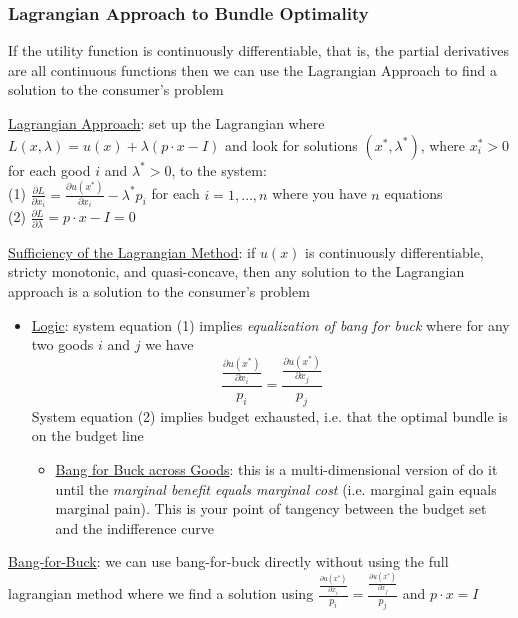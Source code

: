 \documentclass{article}
\begin{document}
\subsubsection{Lagrangian Approach to Bundle Optimality}
If the utility function is continuously differentiable, that is, the partial derivatives are all continuous functions then we can use the Lagrangian Approach to find a solution to the consumer's problem \par \vspace{0.3em}
  \underline{Lagrangian Approach}: set up the Lagrangian where $L(x, \lambda) = u(x) + \lambda (p \cdot x - I)$ and look for solutions $(x^{*}, \lambda^{*})$, where $x_{i}^{*} > 0$ for each good $i$ and $\lambda^{*} > 0$, to the system: \\
  \null\quad (1) $\tfrac{\partial L}{\partial x_{i}} = \tfrac{\partial u(x^{*})}{\partial x_{i}} - \lambda^{*}p_{i}$ \quad for each $i = 1, \dots, n$ where you have $n$ equations \\
  \null\quad (2) $\tfrac{\partial L}{\partial \lambda} = p \cdot x - I = 0$
  \par
  \underline{Sufficiency of the Lagrangian Method}: if $u(x)$ is continuously differentiable, stricty monotonic, and quasi-concave, then any solution to the Lagrangian approach is a solution to the consumer's problem
  \begin{itemize}
    \item  \underline{Logic}: system equation (1) implies \textit{equalization of bang for buck} where for any two goods $i$ and $j$ we have $$\frac{\tfrac{\partial u(x^{*})}{\partial x_{i}}}{p_{i}} = \frac{\tfrac{\partial u(x^{*})}{\partial x_{j}}}{p_{j}}$$ System equation (2) implies budget exhausted, i.e. that the optimal bundle is on the budget line
    \begin{itemize}
      \item  \underline{Bang for Buck across Goods}: this is a multi-dimensional version of do it until the \textit{marginal benefit equals marginal cost} (i.e. marginal gain equals marginal pain). This is your point of tangency between the budget set and the indifference curve
    \end{itemize}
  \end{itemize}
  \par
  \underline{Bang-for-Buck}: we can use bang-for-buck directly without using the full lagrangian method where we find a solution using $\frac{\tfrac{\partial u(x^{*})}{\partial x_{i}}}{p_{i}} = \frac{\tfrac{\partial u(x^{*})}{\partial x_{j}}}{p_{j}}$ and $p \cdot x = I$
\end{document}
